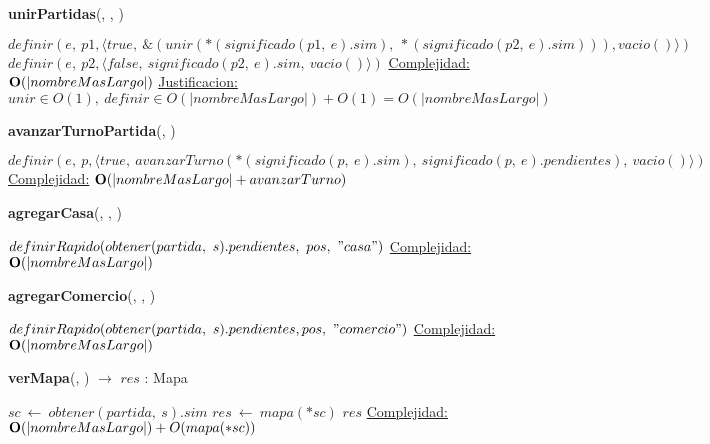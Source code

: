 \begin{Algoritmos}
    \begin{algorithm}[H]{\textbf{unirPartidas}(, , )}
        \begin{algorithmic}[1]
            \State $definir(e,\ p1, \langle true,\ \&(unir(*(significado(p1,\ e).sim),\ *(significado(p2,\ e).sim))), vacio()\rangle)$
            \State $definir(e,\ p2, \langle false,\ significado(p2,\ e).sim,\ vacio() \rangle)$
            \medskip
            \Statex \underline{Complejidad:} $\bold{O}(|nombreMasLargo|)$
            \Statex \underline{Justificacion:} $unir \in O(1),\ definir \in O(|nombreMasLargo|) + O(1) = O(|nombreMasLargo|)$
        \end{algorithmic}
    \end{algorithm}   
    
    \begin{algorithm}[H]{\textbf{avanzarTurnoPartida}(, )}
        \begin{algorithmic}[1]
            \State $definir(e,\ p, \langle true,\ avanzarTurno(*(significado(p,\ e).sim),\ significado(p,\ e).pendientes),\ vacio()\rangle)$
            \medskip
            \Statex \underline{Complejidad:} $\bold{O}(|nombreMasLargo| + avanzarTurno)$
        \end{algorithmic}
    \end{algorithm}   

    \begin{algorithm}[H]{\textbf{agregarCasa}(, , )} %
    \begin{algorithmic}[1]
        \State $definirRapido(obtener(partida,\ s).pendientes,\ pos,\ "casa")$
        \medskip
        \Statex \underline{Complejidad:} $\bold{O}(|nombreMasLargo|)$
    \end{algorithmic}
    \end{algorithm}
    
    \begin{algorithm}[H]{\textbf{agregarComercio}(, , )} %
    \begin{algorithmic}[1]
        \State $definirRapido(obtener(partida,\ s).pendientes, pos,\ "comercio")$ 
        \medskip
        \Statex \underline{Complejidad:} $\bold{O}(|nombreMasLargo|)$
    \end{algorithmic}
    \end{algorithm}

    \begin{algorithm}[H]{\textbf{verMapa}(, ) $\to$ $res$ : Mapa}
    \begin{algorithmic}[1]
        \State $sc\ \leftarrow\ obtener(partida,\ s).sim$
        \State $res\ \leftarrow\ mapa(*sc)$ 
        \State \Return $res$
        \medskip
        \Statex \underline{Complejidad:} $\bold{O}(|nombreMasLargo|) + O(mapa(*sc))$
    \end{algorithmic}
    \end{algorithm}
      

\end{Algoritmos}
